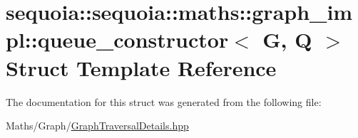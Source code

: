 \hypertarget{structsequoia_1_1sequoia_1_1maths_1_1graph__impl_1_1queue__constructor}{}\section{sequoia\+::sequoia\+::maths\+::graph\+\_\+impl\+::queue\+\_\+constructor$<$ G, Q $>$ Struct Template Reference}
\label{structsequoia_1_1sequoia_1_1maths_1_1graph__impl_1_1queue__constructor}


The documentation for this struct was generated from the following file\+:\begin{DoxyCompactItemize}
\item 
Maths/\+Graph/\mbox{\hyperlink{_graph_traversal_details_8hpp}{Graph\+Traversal\+Details.\+hpp}}\end{DoxyCompactItemize}
